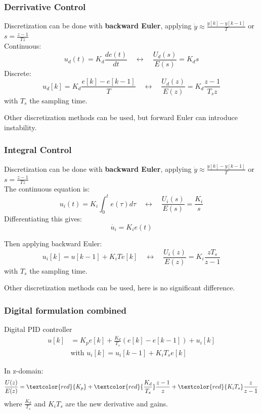 \begin{frame}
	\frametitle{Derrivative Control}
	Discretization can be done with \textbf{backward Euler}, applying $\dot{y} \approx \frac{y[k]-y[k-1]}{T}$ or $s = \frac{z - 1}{Tz}$ \\
	Continuous:
	\begin{equation*}
		u_d(t) = K_d \frac{de(t)}{dt} \quad \leftrightarrow \quad \frac{U_d(s)}{E(s)} = K_d s 
	\end{equation*}
	Discrete:
	\begin{equation*}
	u_d[k] = K_d \frac{ e[k] - e[k-1]}{T} \quad \leftrightarrow \quad \frac{U_d(z)}{E(z)} = K_d \frac{z - 1}{T_sz}
	\end{equation*}
	with $T_s$ the sampling time.
	
	Other discretization methods can be used, but forward Euler can introduce instability.
\end{frame}

\begin{frame}
	\frametitle{Integral Control}
	Discretization can be done with \textbf{backward Euler}, applying $\dot{y} \approx \frac{y[k]-y[k-1]}{T}$ or $s = \frac{z - 1}{Tz}$ \\
	The continuous equation is:
	\begin{equation*}
		u_i(t) = K_i \int_0^t e(\tau)d\tau \quad \leftrightarrow \quad \frac{U_i(s)}{E(s)} = \frac{K_i}{s} 
	\end{equation*}
	Differentiating this gives:
	\begin{equation*}
		\dot{u_i} = K_i e(t)
	\end{equation*}
	
	Then applying backward Euler:
	\begin{equation*}
	u_i[k] = u[k-1] + K_i T e[k] \quad \leftrightarrow \quad \frac{U_i(z)}{E(z)} = K_i \frac{z T_s}{z - 1}
	\end{equation*}
	with $T_s$ the sampling time.
	
	Other discretization methods can be used, here is no significant difference.
\end{frame}

\begin{frame}
	\frametitle{Digital formulation combined}
	
	
	\begin{block}{Digital PID controller}
			\begin{align*}
			u[k] &= K_p e[k] + \frac{K_d}{T_s}(e[k] - e[k-1])+u_i[k] \\
			&\text{with } u_i[k] = u_i[k-1] + K_i T_s e[k]
			\end{align*}
			
			
			In z-domain:
			\begin{equation*}
			\frac{U(z)}{E(z)} = \textcolor{red}{K_p}  + \textcolor{red}{\frac{K_d}{T_s}}\frac{z-1}{z} + \textcolor{red}{K_i T_s}\frac{z}{z-1}
			\end{equation*}
			where $\frac{K_d}{T_s}$ and $K_iT_s$  are the new derivative and gains.
	\end{block}
	
	 
\end{frame}


